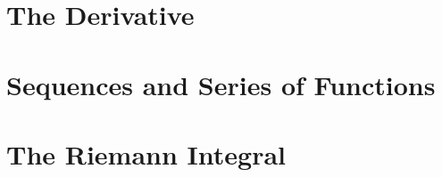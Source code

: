 \documentclass[12pt]{book}
\theoremstyle{definition}
\begin{document}


\chapter{The Derivative}









\chapter{Sequences and Series of Functions}

















\chapter{The Riemann Integral}










\end{document}
